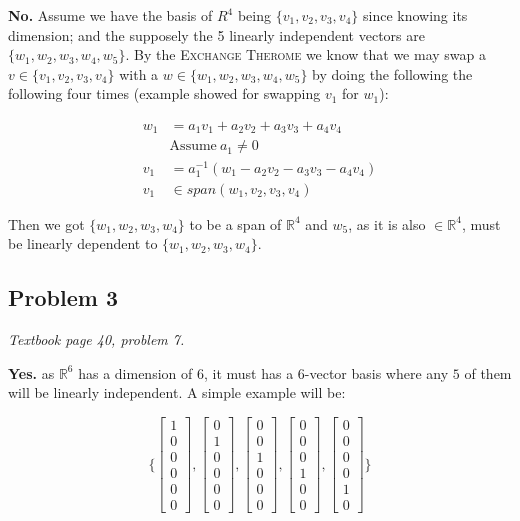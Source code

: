 \documentclass[11pt]{article}
\providecommand{\qbm}[1]{\begin{bmatrix} #1 \end{bmatrix}}
\begin{document}
\textbf{No.} Assume we have the basis of $R^4$ being $\{v_1, v_2, v_3, v_4\}$ since knowing its dimension; and the supposely the 5 linearly independent vectors are $\{w_1, w_2, w_3, w_4, w_5 \}$. By the \textsc{Exchange Therome} we know that we may swap a $v \in \{v_1, v_2, v_3, v_4\}$ with a $w \in \{w_1, w_2, w_3, w_4, w_5 \}$ by doing the following the following four times (example showed for swapping $v_1$ for $w_1$):

\begin{align*}
    w_1 &= a_1 v_1 + a_2 v_2 + a_3 v_3 + a_4 v_4 \\
    &\text{Assume} \ a_1 \neq 0 \\
    v_1 &= a^{-1}_1 (w_1 - a_2 v_2 - a_3 v_3 - a_4 v_4) \\
    v_1 &\in span(w_1, v_2, v_3, v_4)
\end{align*}

Then we got $\{w_1, w_2, w_3, w_4\}$ to be a span of $\mathbb{R}^4$ and $w_5$, as it is also $\in \mathbb{R}^4$, must be linearly dependent to  $\{w_1, w_2, w_3, w_4\}$.




\subsection*{Problem 3}
\textit{Textbook page 40, problem 7.}\newline

\textbf{Yes.} as $\mathbb{R}^6$ has a dimension of $6$, it must has a 6-vector basis where any $5$ of them will be linearly independent. A simple example will be:

\begin{equation*}
    \Big \{ \qbm{1 \\ 0 \\ 0 \\ 0 \\ 0 \\ 0}, \qbm{0 \\ 1 \\ 0 \\ 0 \\ 0 \\ 0}, \qbm{0 \\ 0 \\ 1 \\ 0 \\ 0 \\ 0}, \qbm{0 \\ 0 \\ 0 \\ 1 \\ 0 \\ 0}, \qbm{0 \\ 0 \\ 0 \\ 0 \\ 1 \\ 0} \Big \}
\end{equation*}
\end{document}
